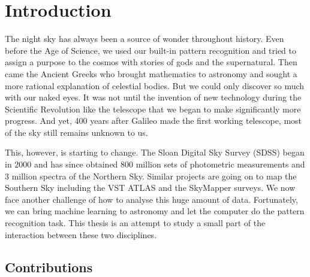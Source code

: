 
\chapter{Introduction}
\label{cha:intro}

The night sky has always been a source of wonder throughout history. Even before the Age of
Science, we used our built-in pattern recognition and tried to assign a purpose to the cosmos with
stories of gods and the supernatural. Then came the Ancient Greeks who brought mathematics to
astronomy and sought a more rational explanation of celestial bodies. But we could only discover so
much with our naked eyes. It was not until the invention of new technology during the Scientific
Revolution like the telescope that we began to make significantly more progress. And yet, 400 years
after Galileo made the first working telescope, most of the sky still remains unknown to us.

This, however, is starting to change. The Sloan Digital Sky Survey (SDSS) began in 2000 and has
since obtained 800 million sets of photometric measurements and 3 million spectra of the Northern
Sky. Similar projects are going on to map the Southern Sky including the VST ATLAS and the
SkyMapper surveys. We now face another challenge of how to analyse this huge amount of data.
Fortunately, we can bring machine learning to astronomy and let the computer do the pattern
recognition task. This thesis is an attempt to study a small part of the interaction between these
two disciplines.

\section{Contributions}
\label{sec:contributions}

